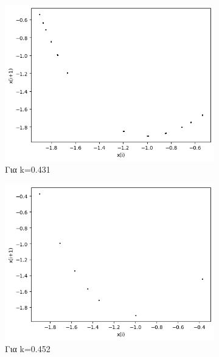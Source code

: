 \begin{figure}[h!]
	\centering
	
	\begin{subfigure}[b]{0.4\textwidth}
		\centering
		\includegraphics[width=\textwidth]{LateX images/graphs q19/g3}
		\caption{Για k=0.431}
		\label{f:k92}
	\end{subfigure}
	\hfill
	\begin{subfigure}[b]{0.4\textwidth}
		\centering
		\includegraphics[width=\textwidth]{LateX images/graphs q19/g4}
		\caption{Για k=0.452}
		\label{f:k93}
	\end{subfigure}
	\hfill
	\begin{subfigure}[b]{0.4\textwidth}
		\centering

\end{subfigure}
\end{figure}
